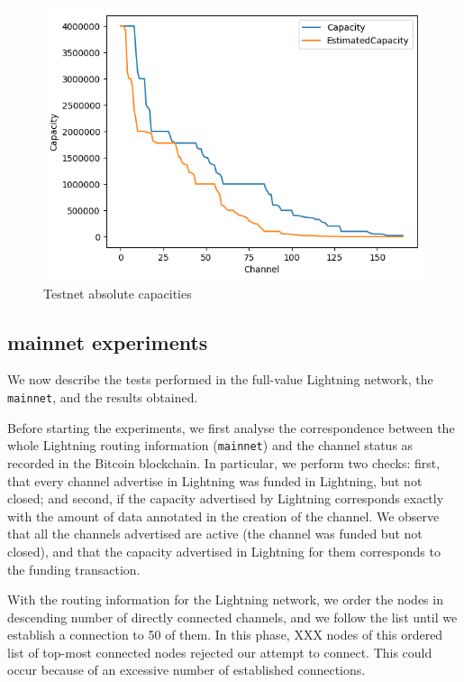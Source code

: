 \begin{figure}[h!]
    \centering
    \includegraphics[width=0.99\linewidth]{img/testnet_absolute_both_directions.png}
    \caption{Testnet absolute capacities}
    \label{fig:testnet_absolute_both_directions}
\end{figure}


\subsection{mainnet experiments}
We now describe the tests performed in the full-value Lightning network, the \texttt{mainnet}, and the results obtained. 

Before starting the experiments, we first analyse the correspondence between the whole Lightning routing information 
(\texttt{mainnet}) and the channel status as recorded in the Bitcoin blockchain. 
In particular, we perform two checks: first, that every channel advertise in Lightning was funded in Lightning, but not closed; 
and second, if the capacity advertised by Lightning corresponds exactly with the amount of data annotated in the creation of the channel.
We observe that all the channels advertised are active (the channel was funded but not closed), 
and that the capacity advertised in Lightning for them corresponds to the funding transaction.

With the routing information for the Lightning network, we order the nodes in descending number of directly connected channels, 
and we follow the list until we establish a connection to 50 of them. 
In this phase, XXX nodes of this ordered list of top-most connected nodes rejected our attempt to connect. This could occur because of an excessive number of established connections.

